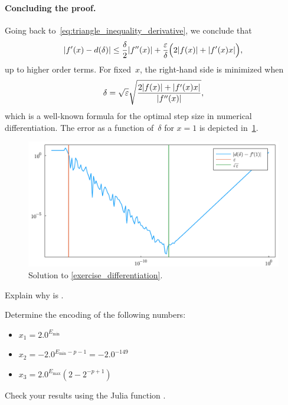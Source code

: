 \begin{solution}
    \paragraph{Concluding the proof.}
    Going back to~\eqref{eq:triangle_inequality_derivative},
    we conclude that
    \[
        \lvert f'(x) - d(\delta) \rvert \leq \frac{\delta}{2} \lvert f''(x) \rvert + \frac{\varepsilon}{\delta} \Bigl( 2 \lvert f(x) \rvert + \lvert f'(x) x \rvert \Bigr),
    \]
    up to higher order terms.
    For fixed~$x$,
    the right-hand side is minimized when
    \[
        \delta = \sqrt{\varepsilon} \sqrt{\frac{ 2 \lvert f(x) \rvert + \lvert f'(x) x \rvert }{\lvert f''(x)\rvert}},
    \]
    which is a well-known formula for the optimal step size in numerical differentiation.
    The error as a function of~$\delta$ for $x = 1$ is depicted in~\cref{fig:differentiation}.
\end{solution}
\begin{figure}[ht]
    \centering
    \includegraphics[width=0.8\linewidth]{figures/numerical_differentiation.pdf}
    \caption{Solution to \cref{exercise_differentiation}.}%
    \label{fig:differentiation}
\end{figure}

\begin{exercise}
    Explain why  is .
\end{exercise}

\begin{exercise}
    Determine the encoding of the following  numbers:
    \begin{itemize}
        \item $x_1 = 2.0^{E_{\min}}$
        \item $x_2 = - 2.0^{E_{\min} - p - 1} = - 2.0^{-149}$
        \item $x_3 =2.0^{E_{\max}} (2-2^{-p+1})$
    \end{itemize}
    Check your results using the Julia function .
\end{exercise}

